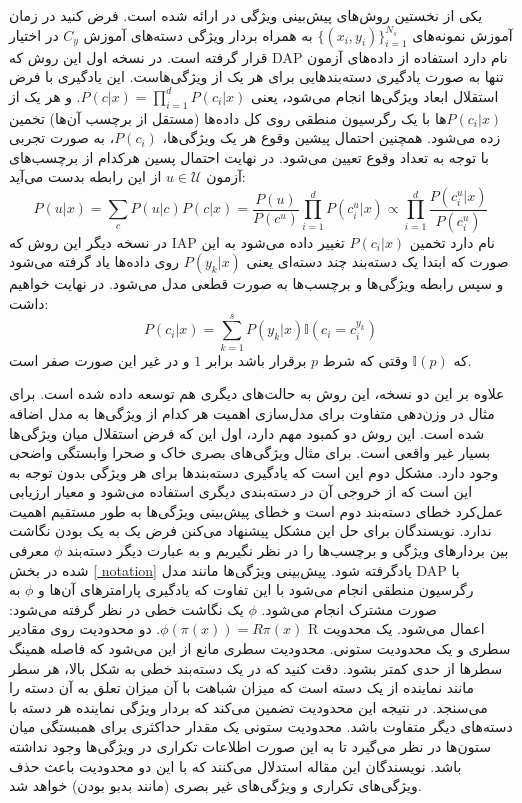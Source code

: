  
یکی از نخستین روش‌های پیش‌بینی ویژگی در \cite{lampert09} ارائه شده است. فرض کنید در زمان آموزش نمونه‌های 
$ \{ (x_i, y_i) \}_{i=1}^{N_s} $ 
به همراه بردار ویژگی دسته‌های آموزش  $C_y$ در اختیار قرار گرفته است. در نسخه اول این روش که DAP نام دارد استفاده از داده‌های آزمون تنها به صورت یادگیری دسته‌بندهایی برای هر یک از ویژگی‌هاست. این یادگیری با فرض استقلال ابعاد ویژگی‌ها انجام می‌شود، یعنی 
$P(c|x) = \prod_{i=1}^d P(c_i|x) $.
و هر یک از $P(c_i|x) $ها با یک رگرسیون منطقی 
روی کل داده‌ها (مستقل از برچسب آن‌ها) تخمین زده می‌شود. همچنین احتمال پیشین وقوع هر یک ویژگی‌ها، $ P(c_i)$، به صورت تجربی با توجه به تعداد وقوع تعیین می‌شود. در نهایت احتمال پسین هرکدام از برچسب‌های آزمون $u \in \mathcal{U}$ از این رابطه بدست می‌آید:
\begin{equation}
P(u | x ) = \sum_{c} P(u | c)P(c|x) = \frac{P(u)}{P(c^u)} \prod_{i=1}^d P(c^u_i|x) \propto \prod_{i=1}^d \frac{P(c^u_i|x)}{P(c^u_i)}
\end{equation}
در نسخه دیگر این روش که IAP نام دارد تخمین  $P(c_i|x) $ تغییر داده می‌شود به این صورت که ابتدا یک دسته‌بند چند دسته‌ای یعنی $P(y_k |x)$ روی داده‌ها یاد گرفته می‌شود و سپس رابطه ویژگی‌ها و برچسب‌ها به صورت قطعی مدل می‌شود. در نهایت خواهیم داشت:
\begin{equation}
P(c_i | x) = \sum_{k=1}^s P(y_k | x) \mathbb{I}(c_i = c^{y_k}_i)
\end{equation}
که $ \mathbb{I}(p) $ وقتی که شرط $p$ برقرار باشد برابر $1$ و در غیر این صورت صفر است. 

علاوه بر این دو نسخه، این روش به حالت‌های دیگری هم توسعه داده شده است. برای مثال در \cite{suzuki14} وزن‌دهی متفاوت برای مدل‌سازی اهمیت هر کدام از ویژگی‌ها به مدل اضافه شده است. این روش دو کمبود مهم دارد، اول این که فرض استقلال میان ویژگی‌ها بسیار غیر واقعی است. برای مثال ویژگی‌های بصری خاک و صحرا وابستگی واضحی وجود دارد. مشکل دوم این است که  یادگیری دسته‌بندها برای هر ویژگی بدون توجه به این است که از خروجی آن در دسته‌بندی دیگری استفاده می‌شود و معیار ارزیابی عمل‌کرد خطای دسته‌بند دوم است و خطای پیش‌بینی ویژگی‌ها به طور مستقیم اهمیت ندارد. نویسندگان \cite{ ajoint11} برای حل این مشکل پیشنهاد می‌کنن فرض یک به یک بودن نگاشت بین بردارهای ویژگی و برچسب‌ها را در نظر نگیریم و به عبارت دیگر  دسته‌بند $\phi$ معرفی شده در بخش
 \ref{ notation} 
  یادگرفته شود. پیش‌بینی ویژگی‌ها مانند مدل DAP با رگرسیون منطقی انجام می‌شود با این تفاوت که یادگیری پارامترهای آن‌ها و  $\phi$ به صورت مشترک انجام می‌شود. $\phi$ یک نگاشت خطی در نظر گرفته می‌شود: 
  $\phi(\pi(x)) = R\pi(x) $. 
 دو محدودیت روی مقادیر R اعمال می‌شود. یک محدویت سطری و یک محدودیت ستونی. محدودیت سطری مانع از این می‌شود که فاصله همینگ سطرها از حدی کمتر بشود. دقت کنید که در یک دسته‌بند خطی به شکل بالا، هر سطر مانند نماینده از یک دسته است که میزان شباهت با آن میزان تعلق به آن دسته را می‌سنجد. در نتیجه این محدودیت تضمین می‌کند که بردار ویژگی نماینده هر دسته با دسته‌های دیگر متفاوت باشد. محدودیت ستونی یک مقدار حداکثری برای همبستگی میان ستون‌ها در نظر می‌گیرد تا به این صورت اطلاعات تکراری در ویژگی‌ها وجود نداشته باشد. نویسندگان این مقاله استدلال می‌کنند که با این دو محدودیت باعث حذف ویژگی‌های تکراری و ویژگی‌های غیر بصری (مانند بدبو بودن) خواهد شد.
 
